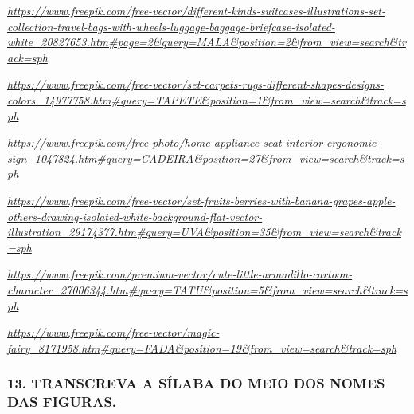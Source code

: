 \href{https://www.freepik.com/free-vector/different-kinds-suitcases-illustrations-set-collection-travel-bags-with-wheels-luggage-baggage-briefcase-isolated-white_20827653.htm\#page=2\&query=MALA\&position=2\&from_view=search\&track=sph}{\emph{https://www.freepik.com/free-vector/different-kinds-suitcases-illustrations-set-collection-travel-bags-with-wheels-luggage-baggage-briefcase-isolated-white\_20827653.htm\#page=2\&query=MALA\&position=2\&from\_view=search\&track=sph}}

\href{https://www.freepik.com/free-vector/set-carpets-rugs-different-shapes-designs-colors_14977758.htm\#query=TAPETE\&position=1\&from_view=search\&track=sph}{\emph{https://www.freepik.com/free-vector/set-carpets-rugs-different-shapes-designs-colors\_14977758.htm\#query=TAPETE\&position=1\&from\_view=search\&track=sph}}

\href{https://www.freepik.com/free-photo/home-appliance-seat-interior-ergonomic-sign_1047824.htm\#query=CADEIRA\&position=27\&from_view=search\&track=sph}{\emph{https://www.freepik.com/free-photo/home-appliance-seat-interior-ergonomic-sign\_1047824.htm\#query=CADEIRA\&position=27\&from\_view=search\&track=sph}}

\href{https://www.freepik.com/free-vector/set-fruits-berries-with-banana-grapes-apple-others-drawing-isolated-white-background-flat-vector-illustration_29174377.htm\#query=UVA\&position=35\&from_view=search\&track=sph}{\emph{https://www.freepik.com/free-vector/set-fruits-berries-with-banana-grapes-apple-others-drawing-isolated-white-background-flat-vector-illustration\_29174377.htm\#query=UVA\&position=35\&from\_view=search\&track=sph}}

\href{https://www.freepik.com/premium-vector/cute-little-armadillo-cartoon-character_27006344.htm\#query=TATU\&position=5\&from_view=search\&track=sph}{\emph{https://www.freepik.com/premium-vector/cute-little-armadillo-cartoon-character\_27006344.htm\#query=TATU\&position=5\&from\_view=search\&track=sph}}

\href{https://www.freepik.com/free-vector/magic-fairy_8171958.htm\#query=FADA\&position=19\&from_view=search\&track=sph}{\emph{https://www.freepik.com/free-vector/magic-fairy\_8171958.htm\#query=FADA\&position=19\&from\_view=search\&track=sph}}

\subsubsection{13. TRANSCREVA A SÍLABA DO MEIO DOS NOMES DAS
FIGURAS.}\label{escreva-a-suxedlaba-do-meio-dos-nomes-das-figuras}

